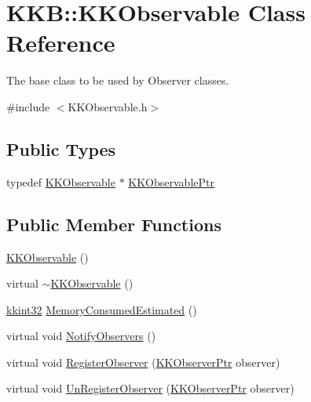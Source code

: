 \hypertarget{class_k_k_b_1_1_k_k_observable}{}\section{K\+KB\+:\+:K\+K\+Observable Class Reference}
\label{class_k_k_b_1_1_k_k_observable}


The base class to be used by Observer classes.  




{\ttfamily \#include $<$K\+K\+Observable.\+h$>$}

\subsection*{Public Types}
\begin{DoxyCompactItemize}
\item 
typedef \hyperlink{class_k_k_b_1_1_k_k_observable}{K\+K\+Observable} $\ast$ \hyperlink{class_k_k_b_1_1_k_k_observable_a5d49993ee949ed5d904d5b2d7972725d}{K\+K\+Observable\+Ptr}
\end{DoxyCompactItemize}
\subsection*{Public Member Functions}
\begin{DoxyCompactItemize}
\item 
\hyperlink{class_k_k_b_1_1_k_k_observable_a5e9a2e1eaeb471bd8264e244c225df1d}{K\+K\+Observable} ()
\item 
virtual \hyperlink{class_k_k_b_1_1_k_k_observable_aebc05e2a5875f3d9db833f52a2734040}{$\sim$\+K\+K\+Observable} ()
\item 
\hyperlink{namespace_k_k_b_a8fa4952cc84fda1de4bec1fbdd8d5b1b}{kkint32} \hyperlink{class_k_k_b_1_1_k_k_observable_a1a7279a4d261466de52a7ec89a7aad21}{Memory\+Consumed\+Estimated} ()
\item 
virtual void \hyperlink{class_k_k_b_1_1_k_k_observable_abb6a5bb2ea885adac9bcc232b3db3789}{Notify\+Observers} ()
\item 
virtual void \hyperlink{class_k_k_b_1_1_k_k_observable_ae84b4e9e500854213b407cabd6a54f83}{Register\+Observer} (\hyperlink{namespace_k_k_b_ae230fa69820db86befff70da824c5b2b}{K\+K\+Observer\+Ptr} observer)
\item 
virtual void \hyperlink{class_k_k_b_1_1_k_k_observable_a7803558795794458de86193a6a8e79a7}{Un\+Register\+Observer} (\hyperlink{namespace_k_k_b_ae230fa69820db86befff70da824c5b2b}{K\+K\+Observer\+Ptr} observer)
\end{DoxyCompactItemize}
